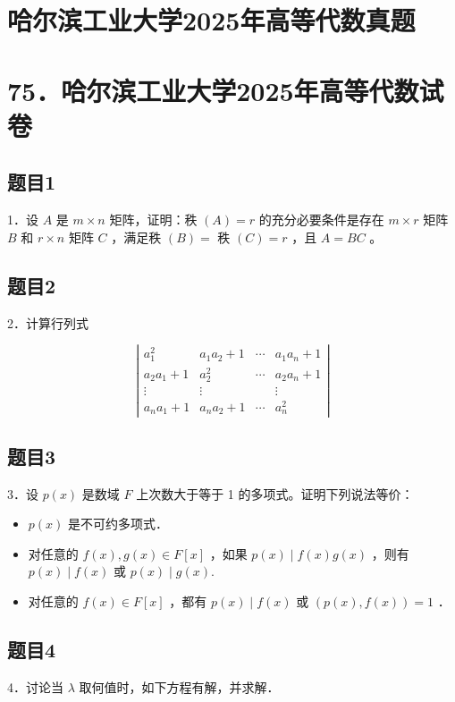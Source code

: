 \documentclass{article}
\begin{document}
\section*{哈尔滨工业大学2025年高等代数真题}
\section*{75．哈尔滨工业大学2025年高等代数试卷}

\subsection{题目1}
1．设 \(A\) 是 \(m \times n\) 矩阵，证明：秩 \((A)=r\) 的充分必要条件是存在 \(m \times r\) 矩阵 \(B\) 和 \(r \times n\) 矩阵 \(C\) ，满足秩 \((B)=\) 秩 \((C)=r\) ，且 \(A=B C\) 。

\subsection{题目2}
2．计算行列式

\[
\left|\begin{array}{cccc}
a_{1}^{2} & a_{1} a_{2}+1 & \cdots & a_{1} a_{n}+1 \\
a_{2} a_{1}+1 & a_{2}^{2} & \cdots & a_{2} a_{n}+1 \\
\vdots & \vdots & & \vdots \\
a_{n} a_{1}+1 & a_{n} a_{2}+1 & \cdots & a_{n}^{2}
\end{array}\right|
\]

\subsection{题目3}
3．设 \(p(x)\) 是数域 \(F\) 上次数大于等于 1 的多项式。证明下列说法等价：

\begin{itemize}
  \item[（1）] \(p(x)\) 是不可约多项式．
  \item[（2）] 对任意的 \(f(x), g(x) \in F[x]\) ，如果 \(p(x) \mid f(x) g(x)\) ，则有 \(p(x) \mid f(x)\) 或 \(p(x) \mid g(x)\).
  \item[（3）] 对任意的 \(f(x) \in F[x]\) ，都有 \(p(x) \mid f(x)\) 或 \((p(x), f(x))=1\) ．
\end{itemize}

\subsection{题目4}
4．讨论当 \(\lambda\) 取何值时，如下方程有解，并求解．
\end{document}
